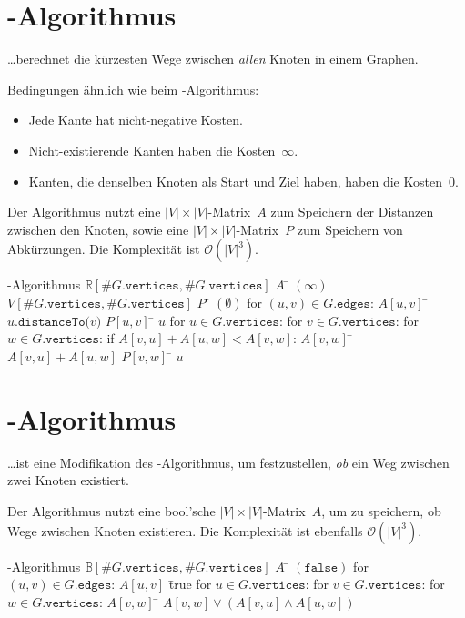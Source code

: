 \section{\protect{}-Algorithmus}
\ldots berechnet die kürzesten Wege zwischen \emph{allen} Knoten in einem Graphen.

Bedingungen ähnlich wie beim -Algorithmus:
\begin{itemize}
  \item Jede Kante hat nicht-negative Kosten.
  \item Nicht-existierende Kanten haben die Kosten~$\infty$.
  \item Kanten, die denselben Knoten als Start und Ziel haben, haben die Kosten~0.
\end{itemize}

Der Algorithmus nutzt eine $\lvert V \rvert \times \lvert V \rvert$-Matrix~$A$ zum Speichern der Distanzen zwischen den Knoten, sowie eine $\lvert V \rvert \times \lvert V \rvert$-Matrix~$P$ zum Speichern von Abkürzungen.
Die Komplexität ist $\mathcal{O}(\lvert V \rvert^3)$.
\begin{mathalgo}{\protect{}-Algorithmus}
$\mathbb{R}[\#G\mathtt{.vertices}, \#G\mathtt{.vertices}]$ $A$ \= $(\infty)$
$V[\#G\mathtt{.vertices}, \#G\mathtt{.vertices}]$ $P$ \= $(\emptyset)$
for $(u,v) \in G\mathtt{.edges}$:
\> $A[u,v]$ \= $u\mathtt{.distanceTo(}v\mathtt{)}$
\> $P[u,v]$ \= $u$
for $u \in G\mathtt{.vertices}$:
\> for $v \in G\mathtt{.vertices}$:
\>\> for $w \in G\mathtt{.vertices}$:
\>\>\> 
\>\>\> if $A[v,u] + A[u,w] < A[v,w]$:
\>\>\>\> $A[v,w]$ \= $A[v,u] + A[u,w]$
\>\>\>\> $P[v,w]$ \= $u$
\end{mathalgo}

\vfil
\pagebreak[2]
\section{\protect{}-Algorithmus}
\ldots ist eine Modifikation des -Algorithmus, um festzustellen, \emph{ob} ein Weg zwischen zwei Knoten existiert.

Der Algorithmus nutzt eine bool'sche $\lvert V \rvert \times \lvert V \rvert$-Matrix~$A$, um zu speichern, ob Wege zwischen Knoten existieren.
Die Komplexität ist ebenfalls $\mathcal{O}(\lvert V \rvert^3)$.
\begin{mathalgo}{\protect{}-Algorithmus}
$\mathbb{B}[\#G\mathtt{.vertices}, \#G\mathtt{.vertices}]$ $A$ \= $(\mathtt{false})$
for $(u,v) \in G\mathtt{.edges}$:
\> $A[u,v]$ \= true
for $u \in G\mathtt{.vertices}$:
\> for $v \in G\mathtt{.vertices}$:
\>\> for $w \in G\mathtt{.vertices}$:
\>\>\> 
\>\>\> $A[v,w]$ \= $A[v,w] \lor (A[v,u] \land A[u,w])$
\end{mathalgo}


